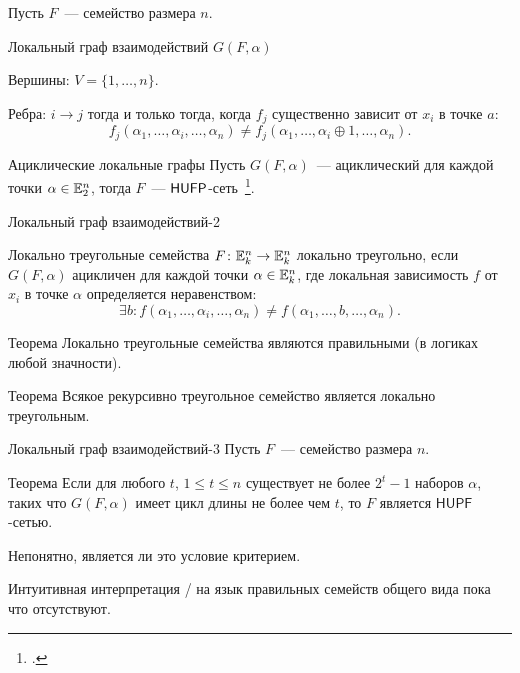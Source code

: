 \begin{frame}%
    Пусть $F$~--- семейство размера $n$.
    \begin{myexample}{{Локальный граф взаимодействий $G(F, \alpha)$}}
        \begin{coloritemize}
        \item Вершины: $V = \{1, \ldots, n\}$.
        \item Ребра: $i \to j$ тогда и только тогда, когда $f_j$ существенно зависит от $x_i$   в точке $a$:
        \[
            f_j(\alpha_1, \ldots, \alpha_i, \ldots, \alpha_n) \ne f_j(\alpha_1, \ldots, \alpha_i \oplus 1, \ldots, \alpha_n).
        \]
        \end{coloritemize}
    \end{myexample}
    \pause 
    \begin{mypropos}{Ациклические локальные графы}
        Пусть $G(F, \alpha)$~--- ациклический для каждой точки $\alpha \in \mathbb{E}_2^n$, тогда $F$~--- $\mathsf{HUFP}$-сеть~\footcite{shih2005combinatorial}.
    \end{mypropos}
\end{frame}


\begin{frame}{Локальный граф взаимодействий-2}
    \begin{myexample}{Локально треугольные семейства}
        $F \colon \mathbb{E}_k^n \to \mathbb{E}_k^n $ локально треугольно, если $G(F, \alpha)$ ацикличен для каждой точки $\alpha \in \mathbb{E}_k^n$, где локальная зависимость $f$ от $x_i$ в точке $\alpha$ определяется неравенством:
        \[
            \exists b \colon f(\alpha_1, \ldots, \alpha_i, \ldots, \alpha_n) \ne f(\alpha_1, \ldots, b, \ldots, \alpha_n).
        \]
    \end{myexample}
    \pause 
    \begin{mytheorem}{Теорема}
        Локально треугольные семейства являются правильными (в логиках любой значности).
    \end{mytheorem}
    \pause
    \begin{mytheorem}{Теорема}
        Всякое рекурсивно треугольное семейство является локально треугольным.
    \end{mytheorem}
\end{frame}


\begin{frame}{Локальный граф взаимодействий-3}
    Пусть $F$~--- семейство размера $n$.
    \begin{mypropos}{Теорема}
        Если для любого $t$, $1 \le t \le n$ существует не более $2^t - 1$ наборов $\alpha$, таких что $G(F, \alpha)$ имеет цикл длины не более чем $t$, то $F$ является $\mathsf{HUPF}$-сетью.
    \end{mypropos}
    \pause
    \begin{coloritemize}
        \item Непонятно, является ли это условие критерием.
        \item Интуитивная интерпретация /   на язык правильных семейств общего вида пока что отсутствуют.
    \end{coloritemize}
\end{frame}


